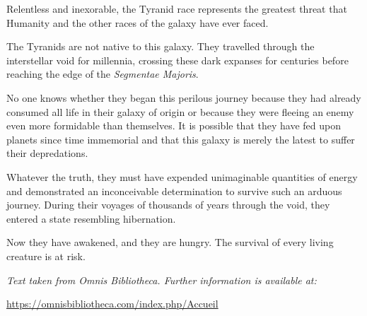 Relentless and inexorable, the Tyranid race represents the greatest threat that Humanity and the other races of the galaxy have ever faced.

The Tyranids are not native to this galaxy. They travelled through the interstellar void for millennia, crossing these dark expanses for centuries before reaching the edge of the \textit{Segmentae Majoris}.

No one knows whether they began this perilous journey because they had already consumed all life in their galaxy of origin or because they were fleeing an enemy even more formidable than themselves. It is possible that they have fed upon planets since time immemorial and that this galaxy is merely the latest to suffer their depredations.

Whatever the truth, they must have expended unimaginable quantities of energy and demonstrated an inconceivable determination to survive such an arduous journey. During their voyages of thousands of years through the void, they entered a state resembling hibernation.

Now they have awakened, and they are hungry. The survival of every living creature is at risk.

\medskip

\noindent\textit{Text taken from Omnis Bibliotheca. Further information is available at:}

\noindent\url{https://omnisbibliotheca.com/index.php/Accueil}